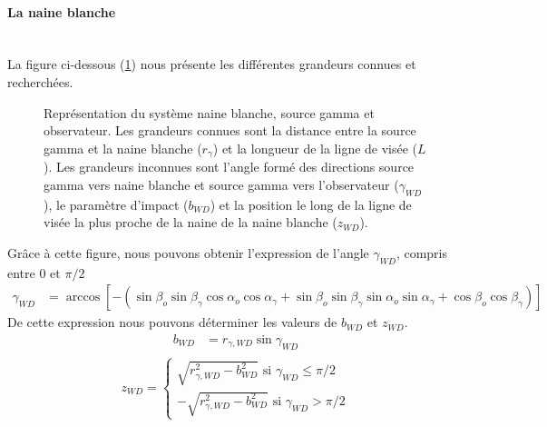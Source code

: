 \documentclass[a4paper,12pt,twoside]{article}
\begin{document}
\paragraph*{La naine blanche} \hspace{0pt} \\
La figure ci-dessous (\ref{fig: WD}) nous présente les différentes grandeurs connues et recherchées.

\begin{figure}[H]
	\centering
    \caption{Représentation du système naine blanche, source gamma et observateur. Les grandeurs connues sont la distance entre la source gamma et la naine blanche ($r_\gamma$) et la longueur de la ligne de visée ($L$). Les grandeurs inconnues sont l'angle formé des directions source gamma vers naine blanche et source gamma vers l'observateur ($\gamma_{WD}$), le paramètre d'impact ($b_{WD}$) et la position le long de la ligne de visée la plus proche de la naine de la naine blanche ($z_{WD}$).}
    \label{fig: WD}
\end{figure}
Grâce à cette figure, nous pouvons obtenir l'expression de l'angle $\gamma_{WD}$, compris entre 0 et $\pi/2$
\begin{align}
	\gamma_{WD} &= \arccos \left[- (\sin\beta_o\sin\beta_\gamma\cos\alpha_o\cos\alpha_\gamma + \sin\beta_o\sin\beta_\gamma\sin\alpha_o\sin\alpha_\gamma + \cos\beta_o\cos\beta_\gamma) \right] 
    \label{eq: gamma_WD}
\end{align}
De cette expression nous pouvons déterminer les valeurs de $b_{WD}$ et $z_{WD}$.
\begin{align*}
	b_{WD} &= r_{\gamma, WD} \sin\gamma_{WD}\\
\end{align*}
\begin{equation*}
	z_{WD} =
    \left\{
    \begin{array} {c}
    	\sqrt{r_{\gamma, WD}^2 - b_{WD}^2} \text{ si $\gamma_{WD} \leq \pi/2$}\\
        -\sqrt{r_{\gamma, WD}^2 - b_{WD}^2} \text{ si $\gamma_{WD} > \pi/2$}
    \end{array}
    \right.
\end{equation*}
\end{document}
